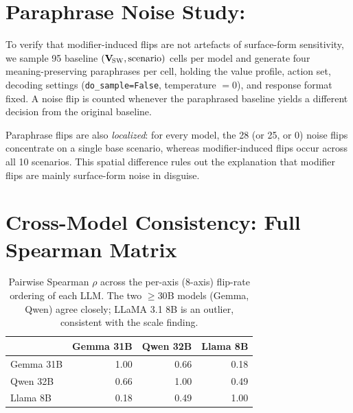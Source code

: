 \documentclass[11pt]{article}
\newcommand{\Vsw}{\mathbf{V}_{\!\textsc{SW}}}
\begin{document}
\section{Paraphrase Noise Study:}
\label{app:noise}

To verify that modifier-induced flips are not artefacts of surface-form sensitivity, we sample 95 baseline $(\Vsw,\text{scenario})$ cells per model and generate four meaning-preserving paraphrases per cell, holding the value profile, action set, decoding settings (\texttt{do\_sample=False}, temperature $=0$), and response format fixed. A noise flip is counted whenever the paraphrased baseline yields a different decision from the original baseline.

\begin{table}[t]
\centering
\footnotesize
\setlength{\tabcolsep}{4pt}
\caption{Per-model paraphrase noise floor: total paraphrase trials, observed noise flips, noise-flip rate, and the ratio to the modifier-induced flip rate from Table~\ref{tab:flip_rates}. A two-proportion $z$-test rejects equality (modifier rate vs.\ noise rate) for all three models at $p<10^{-5}$.}
\label{tab:noise}
\end{table}

Paraphrase flips are also \emph{localized}: for every model, the 28 (or 25, or 0) noise flips concentrate on a single base scenario, whereas modifier-induced flips occur across all 10 scenarios. This spatial difference rules out the explanation that modifier flips are mainly surface-form noise in disguise.

\section{Cross-Model Consistency: Full Spearman Matrix}
\label{app:crossmodel}

\begin{table}[t]
\centering
\small
\begin{tabular}{lrrr}
\hline
 & \textbf{Gemma 31B} & \textbf{Qwen 32B} & \textbf{Llama 8B} \\
\hline
Gemma 31B & 1.00 & 0.66 & 0.18 \\
Qwen  32B & 0.66 & 1.00 & 0.49 \\
Llama 8B & 0.18 & 0.49 & 1.00 \\
\hline
\end{tabular}
\caption{Pairwise Spearman $\rho$ across the per-axis (8-axis) flip-rate ordering of each LLM. The two $\geq 30$B models (Gemma, Qwen) agree closely; LLaMA 3.1 8B is an outlier, consistent with the scale finding.}
\label{tab:crossmodel}
\end{table}
\end{document}
